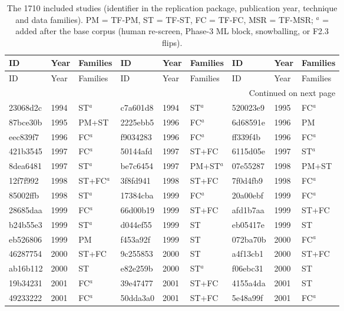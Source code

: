 \scriptsize
\setlength{\tabcolsep}{2.5pt}
\begin{longtable}{lll@{\hspace{10pt}}lll@{\hspace{10pt}}lll}
\caption{The 1710 included studies (identifier in the replication package, publication year, technique and data families). PM = TF-PM, ST = TF-ST, FC = TF-FC, MSR = TF-MSR; $^{a}$ = added after the base corpus (human re-screen, Phase-3 ML block, snowballing, or F2.3 flips).}\label{tab:studies}\\
\toprule
ID & Year & Families & ID & Year & Families & ID & Year & Families \\
\midrule
\endfirsthead
\toprule
ID & Year & Families & ID & Year & Families & ID & Year & Families \\
\midrule
\endhead
\midrule
\multicolumn{9}{r}{Continued on next page}\\
\endfoot
\bottomrule
\endlastfoot
23068d2c & 1994 & ST$^{a}$ & c7a601d8 & 1994 & ST$^{a}$ & 520023e9 & 1995 & FC$^{a}$ \\
87bce30b & 1995 & PM+ST & 2225ebb5 & 1996 & FC$^{a}$ & 6d68591e & 1996 & PM \\
eec839f7 & 1996 & FC$^{a}$ & f9034283 & 1996 & FC$^{a}$ & ff339f4b & 1996 & FC$^{a}$ \\
421b3545 & 1997 & FC$^{a}$ & 50144afd & 1997 & ST+FC & 6115d05e & 1997 & ST$^{a}$ \\
8dea6481 & 1997 & ST$^{a}$ & be7c6454 & 1997 & PM+ST$^{a}$ & 07e55287 & 1998 & PM+ST \\
12f7f992 & 1998 & ST+FC$^{a}$ & 3f8fd941 & 1998 & ST+FC & 7f0d4fb9 & 1998 & FC$^{a}$ \\
85002ffb & 1998 & ST$^{a}$ & 17384cba & 1999 & FC$^{a}$ & 20a00ebf & 1999 & FC$^{a}$ \\
28685daa & 1999 & FC$^{a}$ & 66d00b19 & 1999 & ST+FC & afd1b7aa & 1999 & ST+FC \\
b24b55e3 & 1999 & ST$^{a}$ & d044ef55 & 1999 & ST & eb05417e & 1999 & ST \\
eb526806 & 1999 & PM & f453a92f & 1999 & ST & 072ba70b & 2000 & FC$^{a}$ \\
46287754 & 2000 & ST+FC & 9c255853 & 2000 & ST & a4f13cb1 & 2000 & ST+FC \\
ab16b112 & 2000 & ST & e82e259b & 2000 & ST$^{a}$ & f06ebc31 & 2000 & ST \\
19b34231 & 2001 & FC$^{a}$ & 39e47477 & 2001 & ST+FC & 4155a4da & 2001 & ST \\
49233222 & 2001 & FC$^{a}$ & 50dda3a0 & 2001 & ST+FC & 5e48a99f & 2001 & FC$^{a}$ \\

\end{longtable}

